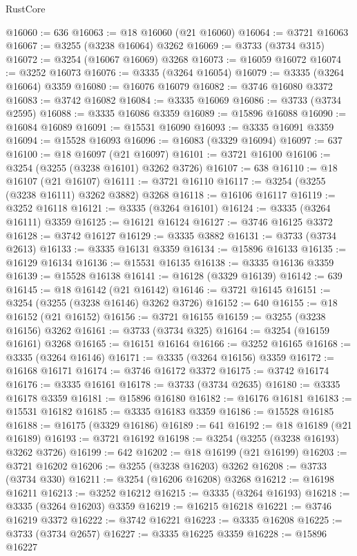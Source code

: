 \begin{lexlean}{RustCore}
\begin{coremodule}
@16060 := 636
@16063 := @18 @16060 (@21 @16060)
@16064 := @3721 @16063
@16067 := @3255 (@3238 @16064) @3262
@16069 := @3733 (@3734 @315)
@16072 := @3254 (@16067 @16069) @3268
@16073 := @16059 @16072
@16074 := @3252 @16073
@16076 := @3335 (@3264 @16054)
@16079 := @3335 (@3264 @16064) @3359
@16080 := @16076 @16079
@16082 := @3746 @16080 @3372
@16083 := @3742 @16082
@16084 := @3335 @16069
@16086 := @3733 (@3734 @2595)
@16088 := @3335 @16086 @3359
@16089 := @15896 @16088
@16090 := @16084 @16089
@16091 := @15531 @16090
@16093 := @3335 @16091 @3359
@16094 := @15528 @16093
@16096 := @16083 (@3329 @16094)
@16097 := 637
@16100 := @18 @16097 (@21 @16097)
@16101 := @3721 @16100
@16106 := @3254 (@3255 (@3238 @16101) @3262 @3726)
@16107 := 638
@16110 := @18 @16107 (@21 @16107)
@16111 := @3721 @16110
@16117 := @3254 (@3255 (@3238 @16111) @3262 @3882) @3268
@16118 := @16106 @16117
@16119 := @3252 @16118
@16121 := @3335 (@3264 @16101)
@16124 := @3335 (@3264 @16111) @3359
@16125 := @16121 @16124
@16127 := @3746 @16125 @3372
@16128 := @3742 @16127
@16129 := @3335 @3882
@16131 := @3733 (@3734 @2613)
@16133 := @3335 @16131 @3359
@16134 := @15896 @16133
@16135 := @16129 @16134
@16136 := @15531 @16135
@16138 := @3335 @16136 @3359
@16139 := @15528 @16138
@16141 := @16128 (@3329 @16139)
@16142 := 639
@16145 := @18 @16142 (@21 @16142)
@16146 := @3721 @16145
@16151 := @3254 (@3255 (@3238 @16146) @3262 @3726)
@16152 := 640
@16155 := @18 @16152 (@21 @16152)
@16156 := @3721 @16155
@16159 := @3255 (@3238 @16156) @3262
@16161 := @3733 (@3734 @325)
@16164 := @3254 (@16159 @16161) @3268
@16165 := @16151 @16164
@16166 := @3252 @16165
@16168 := @3335 (@3264 @16146)
@16171 := @3335 (@3264 @16156) @3359
@16172 := @16168 @16171
@16174 := @3746 @16172 @3372
@16175 := @3742 @16174
@16176 := @3335 @16161
@16178 := @3733 (@3734 @2635)
@16180 := @3335 @16178 @3359
@16181 := @15896 @16180
@16182 := @16176 @16181
@16183 := @15531 @16182
@16185 := @3335 @16183 @3359
@16186 := @15528 @16185
@16188 := @16175 (@3329 @16186)
@16189 := 641
@16192 := @18 @16189 (@21 @16189)
@16193 := @3721 @16192
@16198 := @3254 (@3255 (@3238 @16193) @3262 @3726)
@16199 := 642
@16202 := @18 @16199 (@21 @16199)
@16203 := @3721 @16202
@16206 := @3255 (@3238 @16203) @3262
@16208 := @3733 (@3734 @330)
@16211 := @3254 (@16206 @16208) @3268
@16212 := @16198 @16211
@16213 := @3252 @16212
@16215 := @3335 (@3264 @16193)
@16218 := @3335 (@3264 @16203) @3359
@16219 := @16215 @16218
@16221 := @3746 @16219 @3372
@16222 := @3742 @16221
@16223 := @3335 @16208
@16225 := @3733 (@3734 @2657)
@16227 := @3335 @16225 @3359
@16228 := @15896 @16227

\end{coremodule}
\end{lexlean}
